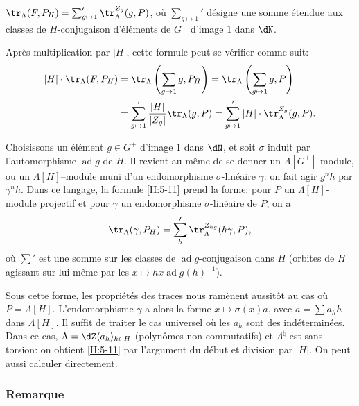 \begin{proposition_}\label{II:5-11}
$\tr_\Lambda(F,P_H) = \sum_{g\mapsto 1}' \tr_\Lambda^{Z_g}(g,P)$, où 
$\sum_{g\mapsto 1}'$ désigne une somme étendue aux classes de 
$H$-conjugaison d'éléments de $G^+$ d'image $1$ dans $\dN$. 
\end{proposition_}

Après multiplication par $|H|$, cette formule peut se vérifier comme suit: 
\begin{align*}
  |H|\cdot \tr_\Lambda(F,P_H) &= \tr_\Lambda\left(\sum_{g\mapsto 1} g,P_H\right) = \tr_\Lambda\left(\sum_{g\mapsto 1} g,P\right) \\
  &= \sum_{g\mapsto 1}' \frac{|H|}{|Z_g|}\tr_\Lambda(g,P) = \sum_{g\mapsto 1}' |H|\cdot \tr_\Lambda^{Z_g}(g,P) \text{.}
\end{align*}

Choisissons un élément $g\in G^+$ d'image $1$ dans $\dN$, et soit 
$\sigma$  induit par l'automorphisme 
$\operatorname{ad} g$ de $H$. Il revient au même de se donner un 
$\Lambda[G^+]$-module, ou un $\Lambda[H]$--module muni d'un endomorphisme 
$\sigma$-linéaire $\gamma$: on fait agir $g^n h$ par $\gamma^n h$. Dans ce 
langage, la formule \ref{II:5-11} prend la forme: pour $P$ un 
$\Lambda[H]$-module projectif et pour $\gamma$ un endomorphisme 
$\sigma$-linéaire de $P$, on a 
\[
  \tr_\Lambda(\gamma,P_H) = \sum_h' \tr_\Lambda^{Z_{hg}}(h\gamma,P)\text{,}
\]
où $\sum'$ est une somme sur les classes de $\operatorname{ad}g$-conjugaison 
dans $H$ (orbites de $H$ agissant sur lui-même par les 
$x\mapsto h x \operatorname{ad} g(h)^{-1}$). 

Sous cette forme, les propriétés des traces nous ramènent aussitôt au 
cas où $P=\Lambda[H]$. L'endomorphisme $\gamma$ a alors la forme 
$x\mapsto \sigma(x) a$, avec $a=\sum a_h h$ dans $\Lambda[H]$. Il suffit de 
traiter le cas universel où les $a_h$ sont des indéterminées. Dans ce 
cas, $\Lambda=\dZ\langle a_h\rangle_{h\in H}$ (polynômes non commutatifs) et 
$\Lambda^\natural$ est sans torsion: on obtient \ref{II:5-11} par l'argument 
du début et division par $|H|$. On peut aussi calculer directement. 





\subsubsection{Remarque}\label{II:5-11-1}

